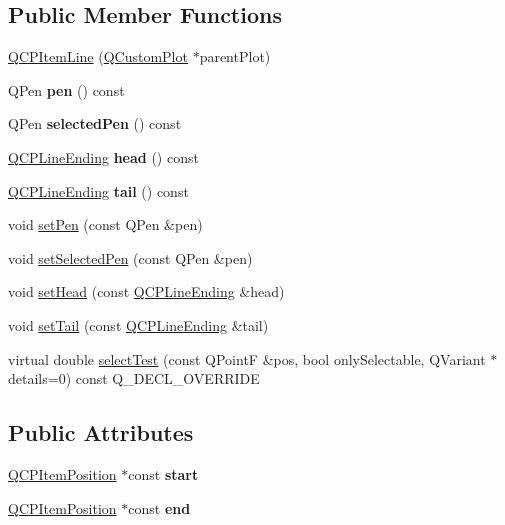 \subsection*{Public Member Functions}
\begin{DoxyCompactItemize}
\item 
\hyperlink{classQCPItemLine_a17804b7f64961c6accf25b61e85142e3}{Q\+C\+P\+Item\+Line} (\hyperlink{classQCustomPlot}{Q\+Custom\+Plot} $\ast$parent\+Plot)
\item 
\mbox{\label{classQCPItemLine_a712e5a7f59db3f4c588dfc370a63e225}} 
Q\+Pen {\bfseries pen} () const
\item 
\mbox{\label{classQCPItemLine_ae1782c4fbecd38054ec3d49d8572a5e5}} 
Q\+Pen {\bfseries selected\+Pen} () const
\item 
\mbox{\label{classQCPItemLine_a6cdc9e87e17418d4b0e66eaa0f041407}} 
\hyperlink{classQCPLineEnding}{Q\+C\+P\+Line\+Ending} {\bfseries head} () const
\item 
\mbox{\label{classQCPItemLine_ac085d3939ec11d7a4d592dc2ed578360}} 
\hyperlink{classQCPLineEnding}{Q\+C\+P\+Line\+Ending} {\bfseries tail} () const
\item 
void \hyperlink{classQCPItemLine_a572528dab61c1abe205822fbd5db4b27}{set\+Pen} (const Q\+Pen \&pen)
\item 
void \hyperlink{classQCPItemLine_a3e2fec44503277e77717e9c24f87f1ea}{set\+Selected\+Pen} (const Q\+Pen \&pen)
\item 
void \hyperlink{classQCPItemLine_aebf3d687114d584e0459db6759e2c3c3}{set\+Head} (const \hyperlink{classQCPLineEnding}{Q\+C\+P\+Line\+Ending} \&head)
\item 
void \hyperlink{classQCPItemLine_ac264222c3297a7efe33df9345c811a5f}{set\+Tail} (const \hyperlink{classQCPLineEnding}{Q\+C\+P\+Line\+Ending} \&tail)
\item 
virtual double \hyperlink{classQCPItemLine_a8e02bfbca04fbcf3dbc375a2bf693229}{select\+Test} (const Q\+PointF \&pos, bool only\+Selectable, Q\+Variant $\ast$details=0) const Q\+\_\+\+D\+E\+C\+L\+\_\+\+O\+V\+E\+R\+R\+I\+DE
\end{DoxyCompactItemize}
\subsection*{Public Attributes}
\begin{DoxyCompactItemize}
\item 
\mbox{\label{classQCPItemLine_a602da607a09498b0f152ada1d6851bc5}} 
\hyperlink{classQCPItemPosition}{Q\+C\+P\+Item\+Position} $\ast$const {\bfseries start}
\item 
\mbox{\label{classQCPItemLine_a15598864c1c22a2497a1979c4980c4e1}} 
\hyperlink{classQCPItemPosition}{Q\+C\+P\+Item\+Position} $\ast$const {\bfseries end}
\end{DoxyCompactItemize}
